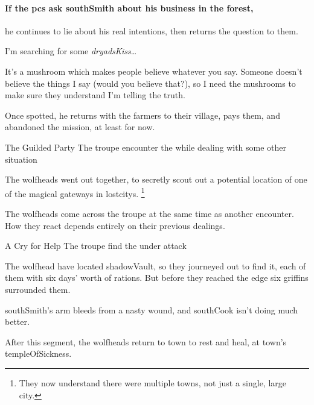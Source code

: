 \paragraph{If the \glspl{pc} ask \gls{southSmith} about his business in the forest,}
he continues to lie about his real intentions, then returns the question to them.

\begin{speechtext}
  I'm searching for some \textit{\gls{dryadsKiss}}\ldots

  It's a mushroom which makes people believe whatever you say.
  Someone doesn't believe the things I say (would you believe that?), so I need the mushrooms to make sure they understand I'm telling the truth.
\end{speechtext}

Once spotted, he returns with the farmers to their \gls{village}, pays them, and abandoned the mission, at least for now.

{The Guilded Party}%
{The troupe encounter the  while dealing with some other situation}%

\begin{exampletext}
  The \glspl{wolfhead} went out together, to secretly scout out a potential location of one of the magical gateways in \glspl{lostcity}.%
  \footnote{They now understand there were multiple towns, not just a single, large city.}
\end{exampletext}

The \glspl{wolfhead} come across the troupe at the same time as another encounter.
How they react depends entirely on their previous dealings.

{A Cry for Help}%
{The troupe find the  under attack}%

The \gls{wolfhead} have located \gls{shadowVault}, so they journeyed out to find it, each of them with six days' worth of \glspl{ration}.
But before they reached the \gls{edge} six griffins surrounded them.

\Gls{southSmith}'s arm bleeds from a nasty wound, and \gls{southCook} isn't doing much better.

After this \gls{segment}, the \glspl{wolfhead} return to \gls{town} to rest and heal, at \gls{town}'s \gls{templeOfSickness}.

\setcounter{wounds}{3}
\southCook

\setcounter{wounds}{3}

